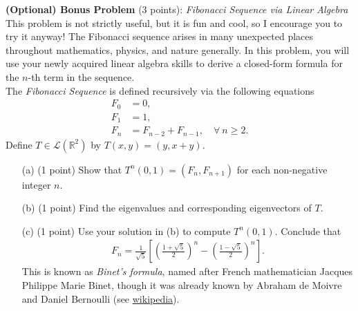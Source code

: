 \documentclass[11pt,letterpaper]{article}
\begin{document}
\textbf{(Optional) Bonus Problem} (3 points): \textit{Fibonacci Sequence via Linear Algebra }\\
This problem is not strictly useful, but it is fun and cool, so I encourage you to try it anyway! The Fibonacci sequence arises in many unexpected places throughout mathematics, physics, and nature generally. In this problem, you will use your newly acquired linear algebra skills to derive a closed-form formula for the $n$-th term in the sequence.\\

The \textit{Fibonacci Sequence} is defined recursively via the following equations 
\begin{align}
    F_0 &= 0,\\
    F_1 &= 1,\\
    F_n &= F_{n-2} + F_{n-1}, \quad \forall~n \geq 2.
\end{align}
Define $T \in \mathcal{L}(\mathbb{R}^2)$ by $T(x,y) = (y,x+y)$.
\begin{enumerate}
    \item[(a)] (1 point) Show that $T^n(0,1) = (F_n,F_{n+1})$ for each non-negative integer $n$.
    \item[(b)] (1 point) Find the eigenvalues and corresponding eigenvectors of $T$.
    \item[(c)] (1 point) Use your solution in (b) to compute $T^n(0,1)$. Conclude that 
    \begin{align}
        F_n = \frac{1}{\sqrt{5}} \left[\left(\frac{1+\sqrt{5}}{2}\right)^n - \left(\frac{1-\sqrt{5}}{2}\right)^n\right].
    \end{align}
    This is known as \textit{Binet's formula}, named after French mathematician Jacques Philippe Marie Binet, though it was already known by Abraham de Moivre and Daniel Bernoulli (see \href{https://en.wikipedia.org/wiki/Fibonacci_sequence#Binet's_formula}{wikipedia}). 
\end{enumerate}
\end{document}
